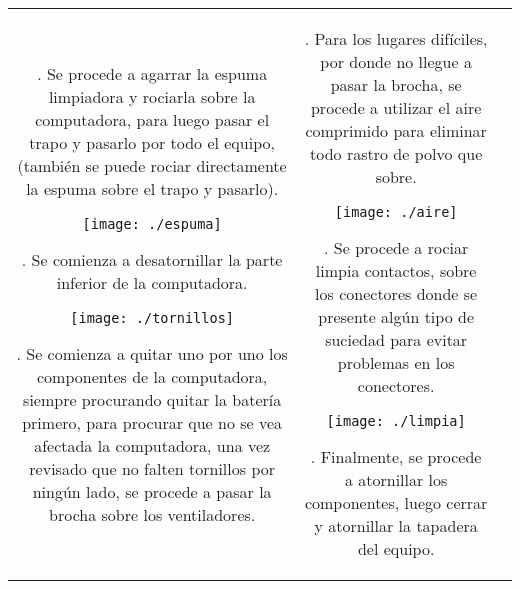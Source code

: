 \documentclass[landscape,12pt]{report}
\begin{document}
\begin{tabular}{c c c}
\begin{minipage}[t]{8.2cm}
				
				\medskip	
				2. Se procede a agarrar la espuma limpiadora y rociarla sobre la computadora, para luego pasar el trapo y pasarlo por todo el equipo, (tambi\'en se puede rociar directamente la espuma sobre el trapo y pasarlo). 
				
				\begin{flushleft}
					\texttt{[image: ./espuma]}
				\end{flushleft}
				
				\medskip
					3. Se comienza a desatornillar la parte inferior de la computadora.
					\begin{center}
				  	\texttt{[image: ./tornillos]}
			  	\end{center}
			  	
			  	\medskip
					 4. Se comienza a quitar uno por uno los componentes de la computadora, siempre procurando quitar la bater\'ia primero, para procurar que no se vea afectada la computadora,  una vez revisado que no falten tornillos por ning\'un lado, se procede a pasar la brocha sobre los ventiladores.
					 
					 							
					 
			    	
				\end{minipage} & 
				
				\begin{minipage}[t]{8.2cm}
				
					
				
			    	\medskip
			    	5. Para los lugares dif\'iciles, por donde no llegue a pasar la brocha, se procede a utilizar el aire comprimido para eliminar todo rastro de polvo que sobre. 
			    	 \begin{center}
				    	\texttt{[image: ./aire]}
			    	\end{center}
			    	\medskip
					 6. Se procede a rociar limpia contactos, sobre los conectores donde se presente alg\'un tipo de suciedad para evitar problemas en los conectores.
				
					  \begin{center}
				    	\texttt{[image: ./limpia]}
			    	\end{center}
			    	
			    	
			    	\medskip
			    7. Finalmente, se procede a atornillar los componentes, luego cerrar y atornillar la tapadera del equipo.
				
			    	
				
			 
			  \end{minipage}
			  						
	
			
\end{tabular}
		 
\end{document}

